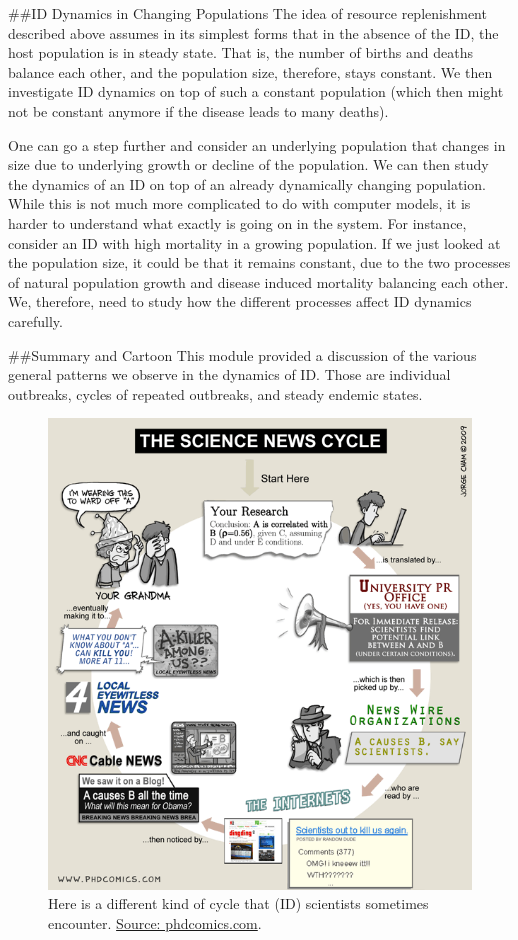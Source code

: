 \documentclass[]{book}
\theoremstyle{definition}
\theoremstyle{definition}
\theoremstyle{definition}
\theoremstyle{remark}
\begin{document}
\#\#ID Dynamics in Changing Populations The idea of resource
replenishment described above assumes in its simplest forms that in the
absence of the ID, the host population is in steady state. That is, the
number of births and deaths balance each other, and the population size,
therefore, stays constant. We then investigate ID dynamics on top of
such a constant population (which then might not be constant anymore if
the disease leads to many deaths).

One can go a step further and consider an underlying population that
changes in size due to underlying growth or decline of the population.
We can then study the dynamics of an ID on top of an already dynamically
changing population. While this is not much more complicated to do with
computer models, it is harder to understand what exactly is going on in
the system. For instance, consider an ID with high mortality in a
growing population. If we just looked at the population size, it could
be that it remains constant, due to the two processes of natural
population growth and disease induced mortality balancing each other.
We, therefore, need to study how the different processes affect ID
dynamics carefully.

\#\#Summary and Cartoon This module provided a discussion of the various
general patterns we observe in the dynamics of ID. Those are individual
outbreaks, cycles of repeated outbreaks, and steady endemic states.

\begin{figure}
\centering
\includegraphics{./images/phd_sciencenewscycle.png}
\caption{\label{fig:sciencenewscycle}Here is a different kind of cycle that
(ID) scientists sometimes encounter.
\href{http://www.phdcomics.com/comics/archive.php?comicid=1174}{Source:
phdcomics.com}.}
\end{figure}
\end{document}
